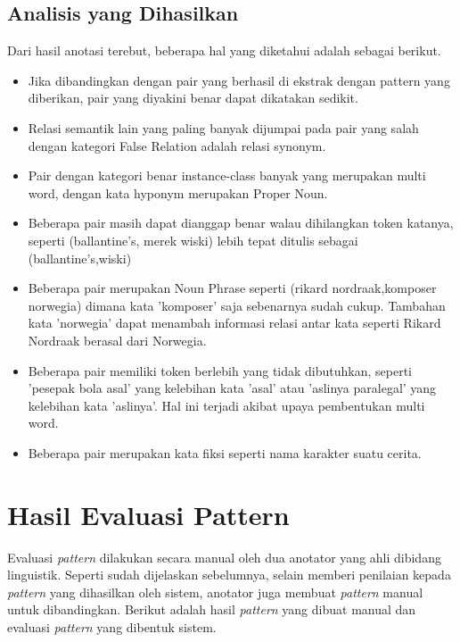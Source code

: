 \subsection{Analisis  yang Dihasilkan}
Dari hasil anotasi terebut, beberapa hal yang diketahui adalah sebagai berikut.
\begin{itemize}
  \item Jika dibandingkan dengan pair yang berhasil di ekstrak dengan pattern yang diberikan, pair yang diyakini benar dapat dikatakan sedikit. 
  \item Relasi semantik lain yang paling banyak dijumpai pada pair yang salah dengan kategori False Relation adalah relasi synonym. 
  \item Pair dengan kategori benar instance-class banyak yang merupakan multi word, dengan kata hyponym merupakan Proper Noun. 
  \item Beberapa pair masih dapat dianggap benar walau dihilangkan token katanya, seperti (ballantine's, merek wiski) lebih tepat ditulis sebagai (ballantine's,wiski)
  \item Beberapa pair merupakan Noun Phrase seperti (rikard nordraak,komposer norwegia) dimana kata 'komposer' saja sebenarnya sudah cukup. Tambahan kata 'norwegia' dapat menambah informasi relasi antar kata seperti Rikard Nordraak berasal dari Norwegia.
  \item Beberapa pair memiliki token berlebih yang tidak dibutuhkan, seperti 'pesepak bola asal' yang kelebihan kata 'asal' atau 'aslinya paralegal' yang kelebihan kata 'aslinya'. Hal ini terjadi akibat upaya pembentukan multi word. 
  \item Beberapa pair merupakan kata fiksi seperti nama karakter suatu cerita.
\end{itemize}

%
\section{Hasil Evaluasi Pattern}
Evaluasi \textit{pattern} dilakukan secara manual oleh dua anotator yang ahli dibidang linguistik. Seperti sudah dijelaskan sebelumnya, selain memberi penilaian kepada \textit{pattern} yang dihasilkan oleh sistem, anotator juga membuat \textit{pattern} manual untuk dibandingkan. Berikut adalah hasil \textit{pattern} yang dibuat manual dan evaluasi \textit{pattern} yang dibentuk sistem.


